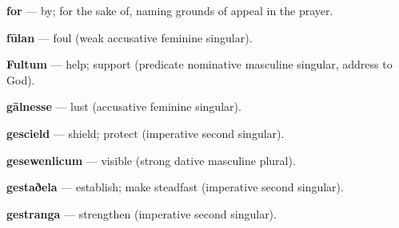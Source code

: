 \textbf{for} — by; for the sake of, naming grounds of appeal in the prayer.

\textbf{fūlan} — foul (weak accusative feminine singular).

\textbf{Fultum} — help; support (predicate nominative masculine singular, address to God).

\textbf{gālnesse} — lust (accusative feminine singular).

\textbf{gescield} — shield; protect (imperative second singular).

\textbf{gesewenlicum} — visible (strong dative masculine plural).

\textbf{gestaðela} — establish; make steadfast (imperative second singular).

\textbf{gestranga} — strengthen (imperative second singular).

